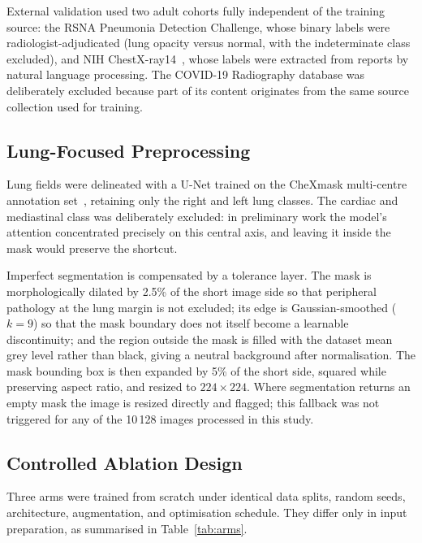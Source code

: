 \documentclass[journal,twoside,web]{ieeecolor}
\begin{document}
External validation used two adult cohorts fully independent of the training source: the RSNA Pneumonia Detection Challenge, whose binary labels were radiologist-adjudicated (lung opacity versus normal, with the indeterminate class excluded), and NIH ChestX-ray14~\cite{wang2017}, whose labels were extracted from reports by natural language processing. The COVID-19 Radiography database was deliberately excluded because part of its content originates from the same source collection used for training.

\subsection{Lung-Focused Preprocessing}
\label{sec:prep}

Lung fields were delineated with a U-Net trained on the CheXmask multi-centre annotation set~\cite{gaggion2024}, retaining only the right and left lung classes. The cardiac and mediastinal class was deliberately excluded: in preliminary work the model's attention concentrated precisely on this central axis, and leaving it inside the mask would preserve the shortcut.

Imperfect segmentation is compensated by a tolerance layer. The mask is morphologically dilated by 2.5\% of the short image side so that peripheral pathology at the lung margin is not excluded; its edge is Gaussian-smoothed ($k=9$) so that the mask boundary does not itself become a learnable discontinuity; and the region outside the mask is filled with the dataset mean grey level rather than black, giving a neutral background after normalisation. The mask bounding box is then expanded by 5\% of the short side, squared while preserving aspect ratio, and resized to $224\times224$. Where segmentation returns an empty mask the image is resized directly and flagged; this fallback was not triggered for any of the 10\,128 images processed in this study.

\subsection{Controlled Ablation Design}
\label{sec:ablation}

Three arms were trained from scratch under identical data splits, random seeds, architecture, augmentation, and optimisation schedule. They differ only in input preparation, as summarised in Table~\ref{tab:arms}.
\end{document}
